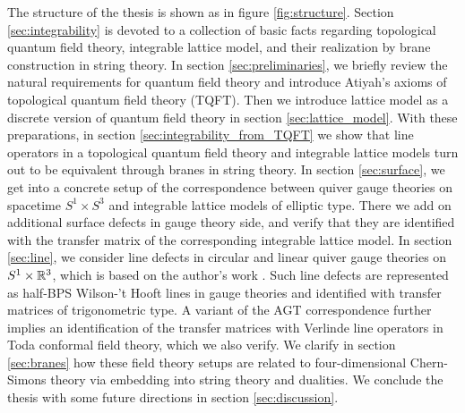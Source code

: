 The structure of the thesis is shown as in figure \ref{fig:structure}.
Section \ref{sec:integrability} is devoted to a collection of basic facts regarding
topological quantum field theory, integrable lattice model, and
their realization by brane construction in string theory.
In section \ref{sec:preliminaries}, we briefly review the natural requirements for quantum field theory
and introduce Atiyah's axioms of topological quantum field theory (TQFT). Then we introduce lattice model as
a discrete version of quantum field theory in section \ref{sec:lattice_model}.
With these preparations, in section \ref{sec:integrability_from_TQFT}
we show that line operators in a topological quantum field theory and
integrable lattice models turn out to be equivalent through branes in string theory.
In section \ref{sec:surface}, we get into a concrete setup of the correspondence
between quiver gauge theories on spacetime $S^1\times S^3$ and
integrable lattice models of elliptic type.
There we add on additional surface defects in gauge theory side, and verify that they are
identified with the transfer matrix of the corresponding integrable lattice model.
In section \ref{sec:line}, we consider line defects in circular and linear quiver gauge
theories on $S^1\times \mathbb{R}^3$, which is based on the author's work \cite{Maruyoshi:2020cwy}.
Such line defects are represented as half-BPS Wilson-'t Hooft lines in gauge theories and
identified with transfer matrices of trigonometric type.
A variant of the AGT correspondence further implies an identification of the transfer matrices with
Verlinde line operators in Toda conformal field theory, which we also verify.
We clarify in section \ref{sec:branes} how these field theory setups are
related to four-dimensional Chern-Simons theory via embedding into string theory and dualities.
We conclude the thesis with some future directions in section \ref{sec:discussion}.


